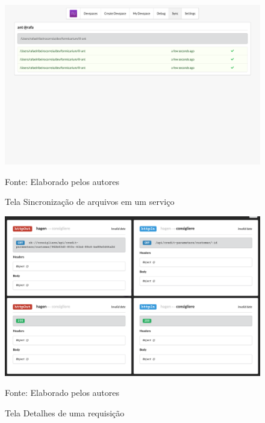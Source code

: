 \documentclass[twosideprint]{politex}
\newcommand{\legend}[1]{\begin{center}\def\caption{}\caption{#1}\end{center}}
\begin{document}
\begin{figure}[htb]
		\caption{\label{fig_frontend_sync}Tela Sincronização de arquivos em um serviço}
		\begin{center}
		\includegraphics[width=\textwidth,keepaspectratio]{pictures/frontend/frontend-sync.png}
		\end{center}
		\legend{Fonte: Elaborado pelos autores}
	\end{figure}
	
\begin{figure}[htb]
		\caption{\label{fig_frontend_tracing_details}Tela Detalhes de uma requisição}
		\begin{center}
		\includegraphics[width=\textwidth,keepaspectratio]{pictures/frontend/frontend-tracing-details.png}
		\end{center}
		\legend{Fonte: Elaborado pelos autores}
	\end{figure}
	
\end{document}
